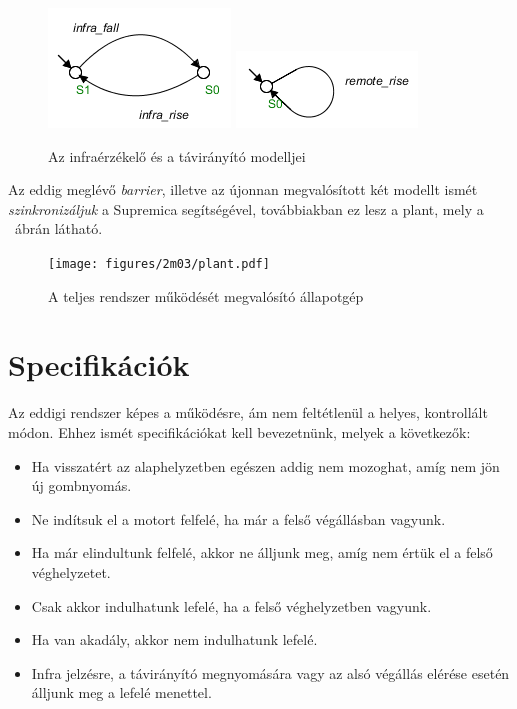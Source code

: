 \begin{figure}
	\centering
	\includegraphics[keepaspectratio]{figures/2m03/b2_infra.png}	\includegraphics[keepaspectratio]{figures/2m03/b_remote.png}
	\caption{Az infraérzékelő és a távirányító modelljei}
	\label{fig:InfraRemote}
\end{figure}

Az eddig meglévő \textit{barrier}, illetve az újonnan megvalósított két modellt ismét \textit{szinkronizáljuk} a Supremica segítségével, továbbiakban ez lesz a plant, mely a ~ábrán látható.

\begin{figure}
	\centering
	\texttt{[image: figures/2m03/plant.pdf]}
	\caption{A teljes rendszer működését megvalósító állapotgép}
	\label{fig:Plant}
\end{figure}

\newpage
\section{Specifikációk}
Az eddigi rendszer képes a működésre, ám nem feltétlenül a helyes, kontrollált módon. Ehhez ismét specifikációkat kell bevezetnünk, melyek a következők:
\begin{itemize}
	\item Ha visszatért az alaphelyzetben egészen addig nem mozoghat, amíg nem jön új gombnyomás.
	\item Ne indítsuk el a motort felfelé, ha már a felső végállásban vagyunk.
	\item Ha már elindultunk felfelé, akkor ne álljunk meg, amíg nem értük el a felső véghelyzetet.
	\item Csak akkor indulhatunk lefelé, ha a felső véghelyzetben vagyunk.
	\item Ha van akadály, akkor nem indulhatunk lefelé.
	\item Infra jelzésre, a távirányító megnyomására vagy az alsó végállás elérése esetén álljunk meg a lefelé menettel.
\end{itemize}

